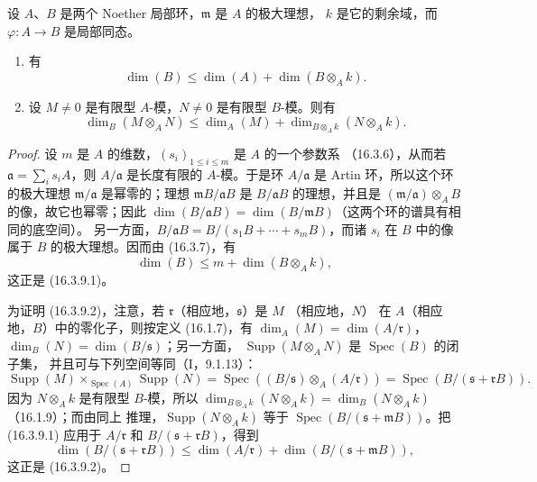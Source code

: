 \begin{proposition}[16.3.9]
\label{0.16.3.9-fr}
设 $A$、$B$ 是两个 Noether 局部环，$\mathfrak{m}$ 是 $A$ 的极大理想，
$k$ 是它的剩余域，而 $\varphi:A\to B$ 是局部同态。
\begin{enumerate}
  \item[\rm{(i)}] 有
  \begin{equation}
  \label{0.16.3.9.1-fr}
  \tag{16.3.9.1}
    \dim(B)\leq\dim(A)+\dim(B\otimes_A k).
  \end{equation}
  \item[\rm{(ii)}] 设 $M\neq0$ 是有限型 $A$-模，$N\neq0$ 是有限型
  $B$-模。则有
  \begin{equation}
  \label{0.16.3.9.2-fr}
  \tag{16.3.9.2}
    \dim_B(M\otimes_A N)
    \leq\dim_A(M)+\dim_{B\otimes_A k}(N\otimes_A k).
  \end{equation}
\end{enumerate}
\end{proposition}

\begin{proof}
设 $m$ 是 $A$ 的维数，$(s_i)_{1\leq i\leq m}$ 是 $A$ 的一个参数系
（16.3.6），从而若 $\mathfrak{a}=\sum_i s_iA$，则 $A/\mathfrak{a}$ 是长度有限的
$A$-模。于是环 $A/\mathfrak{a}$ 是 Artin 环，所以这个环的极大理想
$\mathfrak{m}/\mathfrak{a}$ 是幂零的；理想 $\mathfrak{m}B/\mathfrak{a}B$ 是
$B/\mathfrak{a}B$ 的理想，并且是 $(\mathfrak{m}/\mathfrak{a})\otimes_A B$
的像，故它也幂零；因此
$\dim(B/\mathfrak{a}B)=\dim(B/\mathfrak{m}B)$（这两个环的谱具有相同的底空间）。
另一方面，$B/\mathfrak{a}B=B/(s_1B+\cdots+s_mB)$，而诸 $s_i$ 在 $B$ 中的像
属于 $B$ 的极大理想。因而由 (16.3.7)，有
\[
  \dim(B)\leq m+\dim(B\otimes_A k),
\]
这正是 (16.3.9.1)。

为证明 (16.3.9.2)，注意，若 $\mathfrak{r}$（相应地，$\mathfrak{s}$）是 $M$
（相应地，$N$）
在 $A$（相应地，$B$）中的零化子，则按定义 (16.1.7)，有
$\dim_A(M)=\dim(A/\mathfrak{r})$，$\dim_B(N)=\dim(B/\mathfrak{s})$；另一方面，
$\operatorname{Supp}(M\otimes_A N)$ 是 $\operatorname{Spec}(B)$ 的闭子集，
并且可与下列空间等同（I，9.1.13）：
\[
  \operatorname{Supp}(M)\times_{\operatorname{Spec}(A)}\operatorname{Supp}(N)
  =\operatorname{Spec}((B/\mathfrak{s})\otimes_A(A/\mathfrak{r}))
  =\operatorname{Spec}(B/(\mathfrak{s}+\mathfrak{r}B)).
\]
因为 $N\otimes_A k$ 是有限型 $B$-模，所以
$\dim_{B\otimes_A k}(N\otimes_A k)=\dim_B(N\otimes_A k)$（16.1.9）；而由同上
推理，$\operatorname{Supp}(N\otimes_A k)$ 等于
$\operatorname{Spec}(B/(\mathfrak{s}+\mathfrak{m}B))$。把 (16.3.9.1) 应用于
$A/\mathfrak{r}$ 和 $B/(\mathfrak{s}+\mathfrak{r}B)$，得到
\[
  \dim(B/(\mathfrak{s}+\mathfrak{r}B))
  \leq\dim(A/\mathfrak{r})+
  \dim(B/(\mathfrak{s}+\mathfrak{m}B)),
\]
这正是 (16.3.9.2)。
\end{proof}

